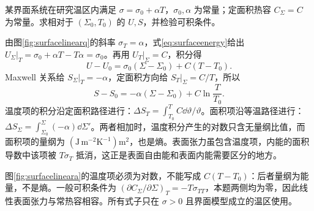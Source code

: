 
\begin{example}[线性表面张力的内能与熵]\label{ex:linearsurface}
某界面系统在研究温区内满足 $\sigma=\sigma_0+\alpha T$，$\sigma_0,\alpha$ 为常量；定面积热容 $C_\Sigma=C$ 为常量。求相对于 $(\Sigma_0,T_0)$ 的 $U,S$，并检验可积条件。
\end{example}
\begin{solution}
由图\ref{fig:surfacelinearq}的斜率 $\sigma_T=\alpha$，式\eqref{eq:surfaceenergy}给出 $U_\Sigma|_T=\sigma_0+\alpha T-T\alpha=\sigma_0$。再用 $U_T|_\Sigma=C$，积分得
\[
 U-U_0=\sigma_0(\Sigma-\Sigma_0)+C(T-T_0).
\]
Maxwell 关系给 $S_\Sigma|_T=-\alpha$，定面积方向给 $S_T|_\Sigma=C/T$，所以
\[
 S-S_0=-\alpha(\Sigma-\Sigma_0)+C\ln\frac T{T_0}.
\]
温度项的积分沿定面积路径进行：$\Delta S_T=\int_{T_0}^T C\dd\vartheta/\vartheta$。面积项沿等温路径进行：$\Delta S_\Sigma=\int_{\Sigma_0}^{\Sigma}(-\alpha)\dd\Sigma'$。两者相加时，温度积分产生的对数只含无量纲比值，而面积项的量纲为 $(\mathrm{J\,m^{-2}K^{-1}})\mathrm{m^2}$，也是熵。表面张力虽包含温度项，内能的面积导数中该项被 $T\sigma_T$ 抵消，这正是表面自由能和表面内能需要区分的地方。

图\ref{fig:surfacelineara}的温度项必须为对数，不能写成 $C(T-T_0)$：后者量纲为能量，不是熵。一般可积条件为 $(\partial C_\Sigma/\partial\Sigma)_T=-T\sigma_{TT}$，本题两侧均为零，因此线性表面张力与常热容相容。所有式子只在 $\sigma>0$ 且界面模型成立的温区使用。
\end{solution}


